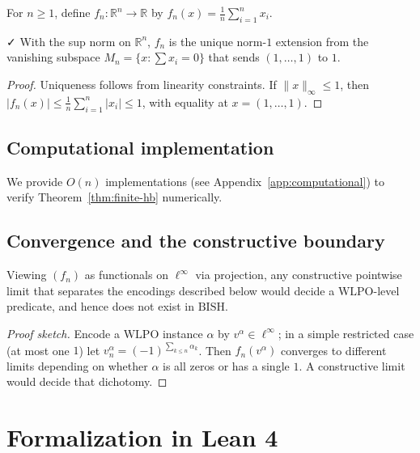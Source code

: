 \documentclass{lmcs}
\newcommand{\leanok}{\textsf{\small \textcolor{green!70!black}{✓}}}
\newcommand{\R}{\mathbb{R}}
\newcommand{\linf}{\ell^\infty}
\newcommand{\WLPO}{\mathrm{WLPO}}
\newcommand{\BISH}{\mathrm{BISH}}
\begin{document}
\begin{defi}
For $n\ge 1$, define $f_n:\R^n\to\R$ by $f_n(x)=\frac{1}{n}\sum_{i=1}^n x_i$.
\end{defi}

\begin{thm}\label{thm:finite-hb}\leanok
With the sup norm on $\R^n$, $f_n$ is the unique norm-$1$ extension from the vanishing subspace $M_n=\{x:\sum x_i=0\}$ that sends $(1,\dots,1)$ to $1$.
\end{thm}

\begin{proof}
Uniqueness follows from linearity constraints. If $\|x\|_\infty\le 1$, then $|f_n(x)|\le \frac{1}{n}\sum_{i=1}^n|x_i|\le 1$, with equality at $x=(1,\dots,1)$.
\end{proof}

\subsection{Computational implementation}

We provide $O(n)$ implementations (see Appendix~\ref{app:computational}) to verify Theorem~\ref{thm:finite-hb} numerically.

\subsection{Convergence and the constructive boundary}

\begin{thm}
Viewing $(f_n)$ as functionals on $\linf$ via projection, any constructive pointwise limit that separates the encodings described below would decide a $\WLPO$-level predicate, and hence does not exist in $\BISH$.
\end{thm}

\begin{proof}[Proof sketch]
Encode a $\WLPO$ instance $\alpha$ by $v^\alpha\in\linf$; in a simple restricted case (at most one $1$) let $v^\alpha_n=(-1)^{\sum_{k\le n}\alpha_k}$. Then $f_n(v^\alpha)$ converges to different limits depending on whether $\alpha$ is all zeros or has a single $1$. A constructive limit would decide that dichotomy.
\end{proof}

\section{Formalization in Lean 4}\label{sec:lean}
\end{document}
